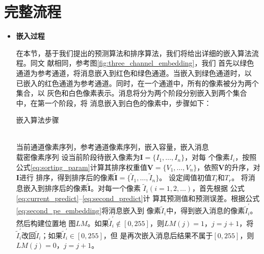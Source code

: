 \section{完整流程}
\begin{itemize}
  \setlength{\parindent}{2em}
  \vspace{-2mm}
  \item \textbf{嵌入过程}
    \vspace{-2mm}
    \par
    在本节，基于我们提出的预测算法和排序算法，我们将给出详细的嵌入算法流程。同文
    献\cite{li2013reversible}相同，参考图\ref{fig:three_channel_embedding}，我们
    首先以绿色通道为参考通道，将消息嵌入到红色和绿色通道。当嵌入到绿色通道时，以
    已嵌入的红色通道为参考通道。同时，在一个通道中，所有的像素被分为两个集合，以
    灰色和白色像素表示。消息将分为两个阶段分别嵌入到两个集合中，在第一个阶段，将
    消息嵌入到白色的像素中，步骤如下：
    \vspace{2mm}
    \begin{algorithm}[!h]
      \renewcommand{\algorithmicrequire}{\textbf{输入：}}
      \renewcommand\algorithmicensure {\textbf{输出：}}
      \caption{嵌入算法步骤}
      \label{alg:embedding_step} 
      \begin{algorithmic}[1]
        \REQUIRE ~~\\ %
        当前通道像素序列，参考通道像素序列，嵌入容量，嵌入消息
        \ENSURE ~~\\ %
        载密像素序列
        \vspace{2mm}
        \STATE 设当前阶段待嵌入像素为$\boldsymbol{I}=\{I_1,\dots,I_n\}$，对每
        个像素$I_i$，按照公式\ref{eq:sorting_param}计算其排序权重值$\boldsymbol{V}
        =\{V_1,\dots,V_n\}$，依照$\boldsymbol{V}$的升序，对$\boldsymbol{I}$进行
        排序，得到排序后的像素$\boldsymbol{\tilde{I}}=\{\tilde{I}_1,\dots,
        \tilde{I}_n\}$。
        \STATE 设定阈值初值$T_l$和$T_r$。
        \STATE 将消息嵌入到排序后的像素$\boldsymbol{\tilde{I}}$。对每一个像素
        $\tilde{I}_i (i=1,2,\dots)$，首先根据
        公式\ref{eq:current_predict}--\ref{eq:second_predict}计
        算其预测值和预测误差。根据公式\ref{eq:second_pe_embedding}将消息嵌入到
        像素$\tilde{I}_i$中，得到嵌入消息的像素$\tilde{I}_i^{'}$。然后构建位置地
        图$LM$。如果$\tilde{I}_i^{'}\notin [0,255]$，则$LM(j)=1$，$j=j+1$，将
        $\tilde{I}_i^{'}$改回$\tilde{I}_i$；如果$\tilde{I}_i^{'}\in [0,255]$，但
        是再次嵌入消息后结果不属于$[0,255]$，则$LM(j)=0$，$j=j+1$。

\end{algorithmic}
\end{algorithm}
\end{itemize}
